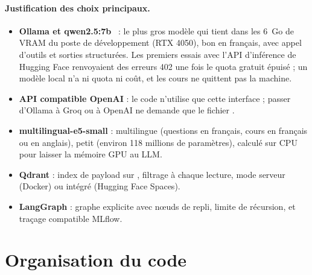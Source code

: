 \documentclass[12pt,a4paper]{report}
\DeclareRobustCommand{\code}[1]{\texttt{\codecasse{#1}}}
\begin{document}
\paragraph{Justification des choix principaux.}
\begin{itemize}
  \item \textbf{Ollama et qwen2.5:7b}~\cite{qwen2025} : le plus gros modèle qui tient dans les 6~Go de
        VRAM du poste de développement (RTX 4050), bon en français, avec appel d'outils et sorties
        structurées. Les premiers essais avec l'API d'inférence de Hugging Face renvoyaient des erreurs
        402 une fois le quota gratuit épuisé ; un modèle local n'a ni quota ni coût, et les cours ne
        quittent pas la machine.
  \item \textbf{API compatible OpenAI} : le code n'utilise que cette interface ; passer d'Ollama à Groq
        ou à OpenAI ne demande que le fichier \code{.env}.
  \item \textbf{multilingual-e5-small} : multilingue (questions en français, cours en français ou en
        anglais), petit (environ 118 millions de paramètres), calculé sur CPU pour laisser la mémoire GPU
        au LLM.
  \item \textbf{Qdrant} : index de payload sur \code{user_id}, filtrage à chaque lecture, mode serveur
        (Docker) ou intégré (Hugging Face Spaces).
  \item \textbf{LangGraph} : graphe explicite avec nœuds de repli, limite de récursion, et traçage
        compatible MLflow.
\end{itemize}

\section{Organisation du code}
\end{document}

